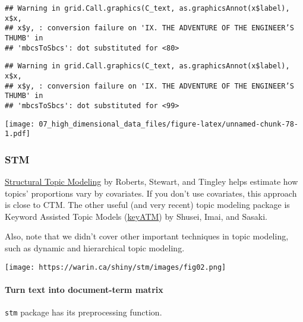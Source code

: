 \documentclass[
]{book}
\newenvironment{Shaded}{\begin{snugshade}}{\end{snugshade}}
\newcommand{\AttributeTok}[1]{\textcolor[rgb]{0.77,0.63,0.00}{#1}}
\newcommand{\ConstantTok}[1]{\textcolor[rgb]{0.00,0.00,0.00}{#1}}
\newcommand{\FunctionTok}[1]{\textcolor[rgb]{0.00,0.00,0.00}{#1}}
\newcommand{\NormalTok}[1]{#1}
\newcommand{\OtherTok}[1]{\textcolor[rgb]{0.56,0.35,0.01}{#1}}
\newcommand{\SpecialCharTok}[1]{\textcolor[rgb]{0.00,0.00,0.00}{#1}}
\begin{document}
\begin{verbatim}
## Warning in grid.Call.graphics(C_text, as.graphicsAnnot(x$label), x$x,
## x$y, : conversion failure on 'IX. THE ADVENTURE OF THE ENGINEER’S THUMB' in
## 'mbcsToSbcs': dot substituted for <80>
\end{verbatim}

\begin{verbatim}
## Warning in grid.Call.graphics(C_text, as.graphicsAnnot(x$label), x$x,
## x$y, : conversion failure on 'IX. THE ADVENTURE OF THE ENGINEER’S THUMB' in
## 'mbcsToSbcs': dot substituted for <99>
\end{verbatim}

\texttt{[image: 07\_high\_dimensional\_data\_files/figure-latex/unnamed-chunk-78-1.pdf]}

\hypertarget{stm}{%
\subsubsection{STM}\label{stm}}

\href{https://www.structuraltopicmodel.com/}{Structural Topic Modeling} by Roberts, Stewart, and Tingley helps estimate how topics' proportions vary by covariates. If you don't use covariates, this approach is close to CTM. The other useful (and very recent) topic modeling package is Keyword Assisted Topic Models (\href{https://keyatm.github.io/keyATM/}{keyATM}) by Shusei, Imai, and Sasaki.

Also, note that we didn't cover other important techniques in topic modeling, such as dynamic and hierarchical topic modeling.

\texttt{[image: https://warin.ca/shiny/stm/images/fig02.png]}

\hypertarget{turn-text-into-document-term-matrix}{%
\paragraph{Turn text into document-term matrix}\label{turn-text-into-document-term-matrix}}

\texttt{stm} package has its preprocessing function.

\begin{Shaded}
\end{Shaded}
\end{document}
